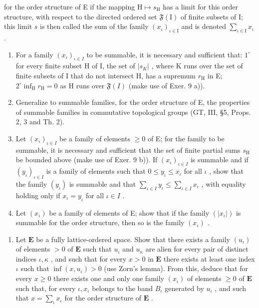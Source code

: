 for the order structure of E if the mapping \(\mathrm{H} \mapsto s_{\mathrm{H}}\) has a limit for this order structure, with respect to the directed ordered set \(\mathfrak{F}(\mathrm{I})\) of finite subsets of I; this limit \(s\) is then called the sum of the family \((x_{\iota})_{\iota \in \mathrm{I}}\) and is denoted \(\sum_{\iota \in \mathrm{I}} x_{\iota}\) .

\begin{enumerate}
\def\labelenumi{\alph{enumi})}
\item
  For a family \((x_{\iota})_{\iota \in I}\) to be summable, it is necessary and sufficient that: \(1^{\circ}\) for every finite subset H of I, the set of \(|s_{K}|\) , where K runs over the set of finite subsets of I that do not intersect H, has a supremum \(r_{\mathrm{H}}\) in E; \(2^{\circ} \inf_{\mathrm{H}} r_{\mathrm{H}} = 0\) as H runs over \(\mathfrak{F}(I)\) (make use of Exer. 9 a)).
\item
  Generalize to summable families, for the order structure of E, the properties of summable families in commutative topological groups (GT, III, §5, Props. 2, 3 and Th. 2).
\item
  Let \((x_{\iota})_{\iota \in I}\) be a family of elements \(\geqslant 0\) of E; for the family to be summable, it is necessary and sufficient that the set of finite partial sums \(s_{\mathrm{H}}\) be bounded above (make use of Exer. 9 b)). If \((x_{\iota})_{\iota \in I}\) is summable and if \((y_{\iota})_{\iota \in I}\) is a family of elements such that \(0 \leqslant y_{\iota} \leqslant x_{\iota}\) for all \(\iota\) , show that the family \((y_{\iota})\) is summable and that \(\sum_{\iota \in I} y_{\iota} \leqslant \sum_{\iota \in I} x_{\iota}\) , with equality holding only if \(x_{\iota} = y_{\iota}\) for all \(\iota \in I\) .
\item
  Let \((x_{\iota})\) be a family of elements of E; show that if the family \((|x_{\iota}|)\) is summable for the order structure, then so is the family \((x_{\iota})\) .
\end{enumerate}

\begin{enumerate}
\def\labelenumi{\arabic{enumi})}
\setcounter{enumi}{11}
\tightlist
\item
  Let \(\mathbf{E}\) be a fully lattice-ordered space. Show that there exists a family \((u_{\iota})\) of elements \(> 0\) of \(\mathbf{E}\) such that \(u_{\iota}\) and \(u_{\kappa}\) are alien for every pair of distinct indices \(\iota, \kappa\) , and such that for every \(x > 0\) in \(\mathbf{E}\) there exists at least one index \(\iota\) such that \(\inf(x, u_{\iota}) > 0\) (use Zorn's lemma). From this, deduce that for every \(x \geqslant 0\) there exists one and only one family \((x_{\iota})\) of elements \(\geqslant 0\) of \(\mathbf{E}\) such that, for every \(\iota, x_{\iota}\) belongs to the band \(B_{\iota}\) generated by \(u_{\iota}\) , and such that \(x = \sum_{\iota} x_{\iota}\) for the order structure of \(\mathbf{E}\) .
\end{enumerate}


